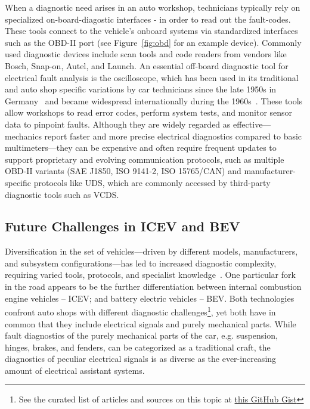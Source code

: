 When a diagnostic need arises in an auto workshop, technicians typically rely on specialized on-board-diagostic interfaces - in order to read out the fault-codes. 
These tools connect to the vehicle’s onboard systems via standardized interfaces such as the OBD-II port (see Figure~\ref{fig:obd} for an example device). 
Commonly used diagnostic devices include scan tools and code readers from vendors like Bosch, Snap-on, Autel, and Launch. 
An essential off-board diagnostic tool for electrical fault analysis is the oscilloscope, 
which has been used in its traditional and auto shop specific variations by car technicians since the late 1950s in Germany~\cite{hameg_history} and became widespread internationally during the 1960s~\cite{autoscope_hist}.
These tools allow workshops to read error codes, perform system tests, and monitor sensor data to pinpoint faults. 
Although they are widely regarded as effective—mechanics report faster and more precise electrical diagnostics compared to basic 
multimeters\cite{reddit_scope_efficiency}—they can be expensive and often require frequent updates to support proprietary and evolving communication protocols, 
such as multiple OBD-II variants (SAE J1850, ISO 9141-2, ISO 15765/CAN) and manufacturer-specific protocols like UDS, which are commonly accessed by third-party 
diagnostic tools such as VCDS\cite{obd2_protocols, obd2_wiki, vcds}.

\subsection{Future Challenges in ICEV and BEV}
Diversification in the set of vehicles—driven by different models, manufacturers, and subsystem configurations—has led to increased diagnostic complexity, 
requiring varied tools, protocols, and specialist knowledge~\cite{autodiagnostics_diversity, trid_diagnostic_complexity}. 
One particular fork in the road appears to be the further differentiation between internal combustion engine vehicles – ICEV; and battery electric vehicles – BEV. 
Both technologies confront auto shops with different diagnostic challenges\footnote{See the curated list of articles and sources on this topic at \href{https://gist.github.com/kathamatician/fbc405fd53297b142fcf41163fad2d1e}{this GitHub Gist}},  
yet both have in common that they include electrical signals and purely mechanical parts. 
While fault diagnostics of the purely mechanical parts of the car, e.g. suspension, hinges, brakes, and fenders, can be categorized as a traditional craft, 
the diagnostics of peculiar electrical signals is as diverse as the ever-increasing amount of electrical assistant systems. 

